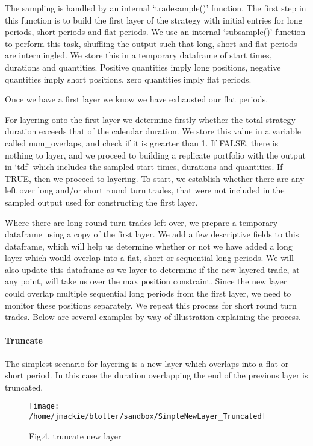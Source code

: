 The sampling is handled by an internal `tradesample()' function. The
first step in this function is to build the first layer of the strategy
with initial entries for long periods, short periods and flat periods.
We use an internal `subsample()' function to perform this task,
shuffling the output such that long, short and flat periods are
intermingled. We store this in a temporary dataframe of start times,
durations and quantities. Positive quantities imply long positions,
negative quantities imply short positions, zero quantities imply flat
periods.

Once we have a first layer we know we have exhausted our flat periods.

For layering onto the first layer we determine firstly whether the total
strategy duration exceeds that of the calendar duration. We store this
value in a variable called num\_overlaps, and check if it is grearter
than 1. If FALSE, there is nothing to layer, and we proceed to building
a replicate portfolio with the output in `tdf' which includes the
sampled start times, durations and quantities. If TRUE, then we proceed
to layering. To start, we establish whether there are any left over long
and/or short round turn trades, that were not included in the sampled
output used for constructing the first layer.

Where there are long round turn trades left over, we prepare a temporary
dataframe using a copy of the first layer. We add a few descriptive
fields to this dataframe, which will help us determine whether or not we
have added a long layer which would overlap into a flat, short or
sequential long periods. We will also update this dataframe as we layer
to determine if the new layered trade, at any point, will take us over
the max position constraint. Since the new layer could overlap multiple
sequential long periods from the first layer, we need to monitor these
positions separately. We repeat this process for short round turn
trades. Below are several examples by way of illustration explaining the
process.

\hypertarget{truncate}{%
\paragraph{Truncate}\label{truncate}}

The simplest scenario for layering is a new layer which overlaps into a
flat or short period. In this case the duration overlapping the end of
the previous layer is truncated.

\begin{Schunk}
\begin{figure}

{\centering \texttt{[image: /home/jmackie/blotter/sandbox/SimpleNewLayer\_Truncated]} 

}

\caption[Fig.4]{Fig.4. truncate new layer}\label{fig:SimpleNewLayer_Truncated diagram}
\end{figure}
\end{Schunk}

